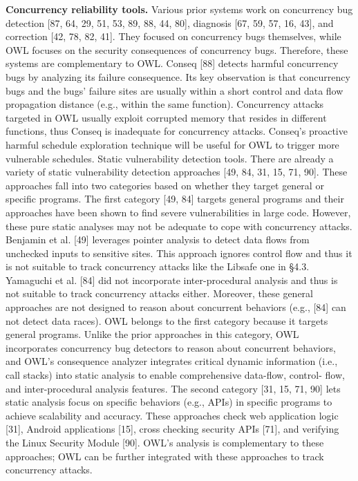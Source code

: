 \noindent
\textbf{Concurrency reliability tools.} Various prior systems work
on concurrency bug detection [87, 64, 29, 51, 53, 89, 88, 44,
80], diagnosis [67, 59, 57, 16, 43], and correction [42, 78,
82, 41]. They focused on concurrency bugs themselves, while
OWL focuses on the security consequences of concurrency
bugs. Therefore, these systems are complementary to OWL.
Conseq [88] detects harmful concurrency bugs by analyzing
its failure consequence. Its key observation is that concurrency
bugs and the bugs’ failure sites are usually within a
short control and data flow propagation distance (e.g., within
the same function). Concurrency attacks targeted in OWL
usually exploit corrupted memory that resides in different
functions, thus Conseq is inadequate for concurrency attacks.
Conseq’s proactive harmful schedule exploration technique
will be useful for OWL to trigger more vulnerable schedules.
Static vulnerability detection tools. There are already a variety
of static vulnerability detection approaches [49, 84, 31,
15, 71, 90]. These approaches fall into two categories based
on whether they target general or specific programs.
The first category [49, 84] targets general programs and
their approaches have been shown to find severe vulnerabilities
in large code. However, these pure static analyses may
not be adequate to cope with concurrency attacks. Benjamin
et al. [49] leverages pointer analysis to detect data flows from
unchecked inputs to sensitive sites. This approach ignores
control flow and thus it is not suitable to track concurrency
attacks like the Libsafe one in §4.3. Yamaguchi et al. [84]
did not incorporate inter-procedural analysis and thus is not
suitable to track concurrency attacks either. Moreover, these
general approaches are not designed to reason about concurrent
behaviors (e.g., [84] can not detect data races).
OWL belongs to the first category because it targets general
programs. Unlike the prior approaches in this category,
OWL incorporates concurrency bug detectors to reason about
concurrent behaviors, and OWL’s consequence analyzer integrates
critical dynamic information (i.e., call stacks) into
static analysis to enable comprehensive data-flow, control-
flow, and inter-procedural analysis features.
The second category [31, 15, 71, 90] lets static analysis
focus on specific behaviors (e.g., APIs) in specific programs
to achieve scalability and accuracy. These approaches check
web application logic [31], Android applications [15], cross
checking security APIs [71], and verifying the Linux Security
Module [90]. OWL’s analysis is complementary to these
approaches; OWL can be further integrated with these approaches
to track concurrency attacks.

